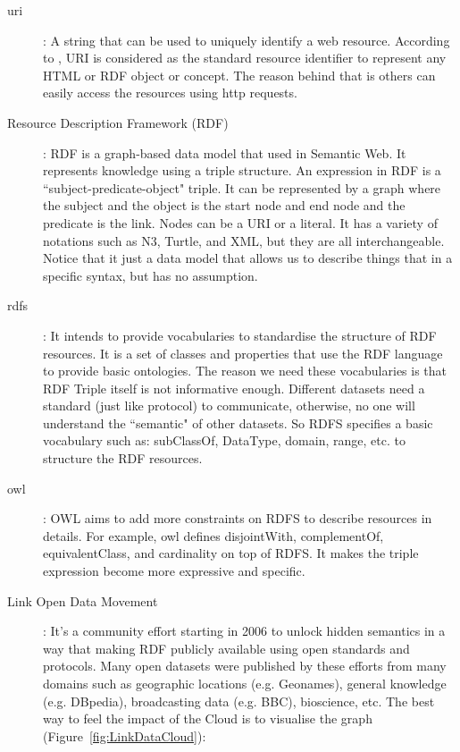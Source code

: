\begin{description}


\item[\gls{uri}]: A string that can be used to uniquely identify a web resource. According to \cite{berners2006design}, URI is considered as the standard resource identifier to represent any HTML or RDF object or concept. The reason behind that is others can easily access the resources using \gls{http} requests.

\item[Resource Description Framework (RDF)]: RDF is a graph-based data model that used in Semantic Web. It represents knowledge using a triple structure. An expression in RDF is a ``subject-predicate-object" triple. It can be represented by a graph where the subject and the object is the start node and end node and the predicate is the link. Nodes can be a URI or a literal.  It has a variety of notations such as N3, Turtle, and XML, but they are all interchangeable. Notice that it just a data model that allows us to describe things that in a specific syntax, but has no assumption.


\item[\gls{rdfs}]: It intends to provide vocabularies to standardise the structure of RDF resources. It is a set of classes and properties that use the RDF language to provide basic ontologies. The reason we need these vocabularies is that RDF Triple itself is not informative enough.  Different datasets need a standard (just like protocol) to communicate, otherwise, no one will understand the ``semantic" of other datasets. So RDFS specifies a basic vocabulary such as: subClassOf, DataType, domain, range, etc. to structure the RDF resources.

\item[\gls{owl}]: OWL aims to add more constraints on RDFS to describe resources in details. For example, owl defines disjointWith, complementOf, equivalentClass, and cardinality on top of RDFS. It makes the triple expression become more expressive and specific.

\item[Link Open Data Movement]: It's a community effort starting in 2006 to unlock hidden semantics in a way that making RDF publicly available using open standards and protocols. Many open datasets were published by these efforts from many domains such as geographic locations (e.g. Geonames), general knowledge (e.g. DBpedia), broadcasting data (e.g. BBC), bioscience, etc. The best way to feel the impact of the Cloud is to visualise the graph (Figure~\ref{fig:LinkDataCloud}):


\end{description}

